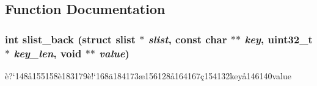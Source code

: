 \subsection{Function Documentation}
\subsubsection{\setlength{\rightskip}{0pt plus 5cm}int slist\_\-back (struct slist $\ast$ {\em slist}, const char $\ast$$\ast$ {\em key}, uint32\_\-t $\ast$ {\em key\_\-len}, void $\ast$$\ast$ {\em value})}\label{slist_8h_a7}


\`{e}?`148\aa{}155158\`{e}183179\`{e}!`168\"{a}184173\ae{}156128\aa{}164167\c{c}154132key\aa{}146140value 

